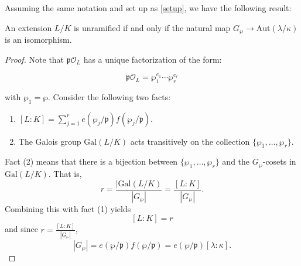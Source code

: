 Assuming the same notation and set up as \ref{setup}, we have the following result:

\begin{proposition}
    An extension $L/K$ is unramified if and only if the natural map $G_\wp \to \textrm{Aut}(\lambda/\kappa)$ is an isomorphism.
\end{proposition}

\begin{proof}
    Note that $\mathfrak{p} \mathcal{O}_{L}$ has a unique factorization of the form:

    \[\mathfrak{p}\mathcal{O}_{L} = \wp_1^{e_1}\cdots \wp_r^{e_r}\]

    with $\wp_1 = \wp$. Consider the following two facts:

    \begin{enumerate}[(1)]
        \item $[L:K] = \sum_{j=1}^r e(\wp_j/\mathfrak{p})f(\wp_j/\mathfrak{p})$.
        \item The Galois group $\textrm{Gal}(L/K)$ acts transitively on the collection $\{\wp_1, \ldots, \wp_r\}$. 
    \end{enumerate}
    Fact (2) means that there is a bijection between $\{\wp_1, \ldots, \wp_r\}$ and the $G_\wp$-cosets in $\textrm{Gal}(L/K)$. That is,
        \[r = \frac{|\textrm{Gal}(L/K)}{|G_\wp|} = \frac{[L:K]}{|G_\wp|}.\]
    Combining this with fact (1) yields
        \[[L:K] = r \]
    and since $r = \frac{[L:K]}{|G_\wp|}$,
        \[|G_\wp| = e(\wp/\mathfrak{p})f(\wp/\mathfrak{p}) = e(\wp/\mathfrak{p})[\lambda:\kappa].\]
\end{proof}

